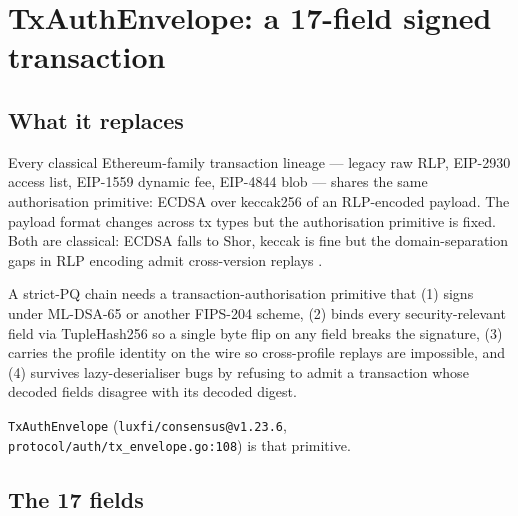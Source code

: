 \section{TxAuthEnvelope: a 17-field signed transaction}
\label{sec:tx-auth-envelope}

\subsection{What it replaces}

Every classical Ethereum-family transaction lineage --- legacy raw RLP,
EIP-2930 access list, EIP-1559 dynamic fee, EIP-4844 blob --- shares the same
authorisation primitive: ECDSA over keccak256 of an RLP-encoded payload. The
payload format changes across tx types but the authorisation primitive is
fixed. Both are classical: ECDSA falls to Shor, keccak is fine but the
domain-separation gaps in RLP encoding admit cross-version replays
\cite{eip2718,eip7932}.

A strict-PQ chain needs a transaction-authorisation primitive that (1) signs
under ML-DSA-65 or another FIPS-204 scheme, (2) binds every security-relevant
field via TupleHash256 so a single byte flip on any field breaks the
signature, (3) carries the profile identity on the wire so cross-profile
replays are impossible, and (4) survives lazy-deserialiser bugs by refusing to
admit a transaction whose decoded fields disagree with its decoded digest.

\texttt{TxAuthEnvelope} (\texttt{luxfi/consensus@v1.23.6},
\texttt{protocol/auth/tx\_envelope.go:108}) is that primitive.

\subsection{The 17 fields}

